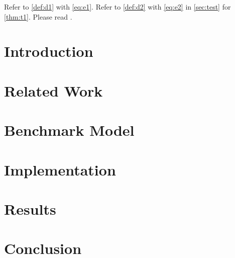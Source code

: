 \documentclass{llncs}
\begin{document}
Refer to \cref{def:d1} with \cref{eq:e1}.
Refer to \cref{def:d2} with \cref{eq:e2} in \cref{sec:test} for \cref{thm:t1}.
Please read \cite{montecarlo}.

\section{Introduction}


\section{Related Work}

\section{Benchmark Model}

\section{Implementation}

\section{Results}

\section{Conclusion}

\printbibliography
\end{document}
